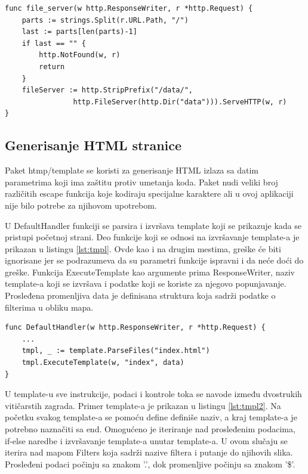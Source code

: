 \documentclass[12pt,oneside]{memoir}
\begin{document}
\begin{center}
\begin{lstlisting}[caption=Handler za fajl sistem,label={lst:fileserver},  backgroundcolor=\color{background},belowskip=-0.8 \baselineskip]
func file_server(w http.ResponseWriter, r *http.Request) {
	parts := strings.Split(r.URL.Path, "/")
	last := parts[len(parts)-1]
	if last == "" {
		http.NotFound(w, r)
		return
	}
	fileServer := http.StripPrefix("/data/", 
				http.FileServer(http.Dir("data"))).ServeHTTP(w, r)
}
\end{lstlisting}
\end{center}

\subsection{Generisanje HTML stranice}

Paket htmp/template se koristi za generisanje HTML izlaza sa datim parametrima koji ima zaštitu protiv umetanja koda. Paket nudi veliki broj različitih escape funkcija koje kodiraju specijalne karaktere ali u ovoj aplikaciji nije bilo potrebe za njihovom upotrebom. 

U DefaultHandler funkciji se parsira i izvršava template koji se prikazuje kada se pristupi početnoj strani. Deo funkcije koji se odnosi na izvršavanje template-a je prikazan u listingu \ref{lst:tmpl}. Ovde kao i na drugim mestima, greške će biti ignorisane jer se podrazumeva da su parametri funkcije ispravni i da neće doći do greške. Funkcija ExecuteTemplate kao argumente prima ResponseWriter, naziv template-a koji se izvršava i podatke koji se koriste za njegovo popunjavanje. Prosleđena promenljiva data je definisana struktura koja sadrži podatke o filterima u obliku mapa.

\begin{center}
\begin{lstlisting}[caption=Izvršavanje HTML šablona,label={lst:tmpl},  backgroundcolor=\color{background},belowskip=-0.8 \baselineskip]
func DefaultHandler(w http.ResponseWriter, r *http.Request) {
	...
	tmpl, _ := template.ParseFiles("index.html")
	tmpl.ExecuteTemplate(w, "index", data)
}
\end{lstlisting}
\end{center}

U template-u sve instrukcije, podaci i kontrole toka se navode između dvostrukih vitičarstih zagrada. Primer template-a je prikazan u listingu \ref{lst:tmpl2}. Na početku svakog template-a se pomoću define definiše naziv, a kraj template-a je potrebno naznačiti sa end. Omogućeno je iteriranje nad prosleđenim podacima, if-else naredbe i izvršavanje template-a unutar template-a. U ovom slučaju se iterira nad mapom Filters koja sadrži nazive filtera i putanje do njihovih slika. Prosleđeni podaci počinju sa znakom '.', dok promenljive počinju sa znakom '\$'. 
\end{document}
